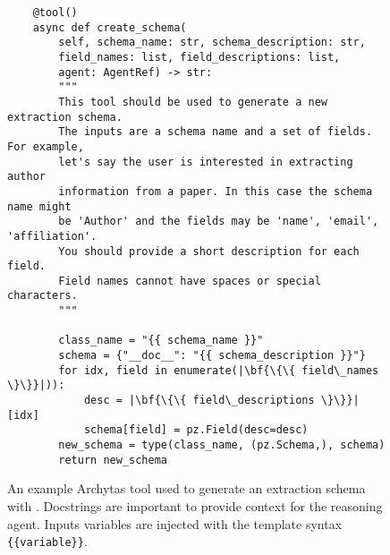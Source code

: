 \begin{figure}[t]
\begin{verbatim}
    @tool()
    async def create_schema(
        self, schema_name: str, schema_description: str, 
        field_names: list, field_descriptions: list, 
        agent: AgentRef) -> str:
        """
        This tool should be used to generate a new extraction schema. 
        The inputs are a schema name and a set of fields. For example, 
        let's say the user is interested in extracting author 
        information from a paper. In this case the schema name might 
        be 'Author' and the fields may be 'name', 'email', 'affiliation'.
        You should provide a short description for each field. 
        Field names cannot have spaces or special characters.
        """
        
        class_name = "{{ schema_name }}"
        schema = {"__doc__": "{{ schema_description }}"}
        for idx, field in enumerate(|\bf{\{\{ field\_names \}\}}|)):
            desc = |\bf{\{\{ field\_descriptions \}\}}|[idx]
            schema[field] = pz.Field(desc=desc)       
        new_schema = type(class_name, (pz.Schema,), schema)
        return new_schema
\end{verbatim}
\caption{An example Archytas tool used to generate an extraction schema with \sys. Docstrings are important to provide context for the reasoning agent. Inputs variables are injected with the template syntax \texttt{\{\{variable\}\}}.}
\label{fig:toolcode}
\end{figure}